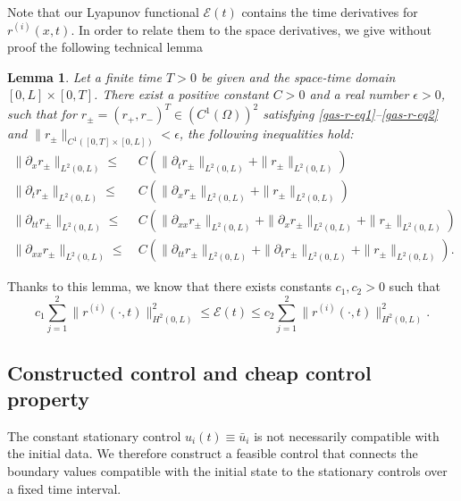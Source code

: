 \documentclass[12pt]{article}
\newtheorem{lemma}[theorem]{Lemma}
\numberwithin{equation}{section}
\begin{document}
Note that our Lyapunov functional $\mathcal{E}(t)$ contains the time derivatives for $r^{(i)}(x,t)$.
In order to relate them to the space
derivatives, we give without proof the following technical lemma \cite{MR3049647}
\begin{lemma}
Let a finite time $T > 0$ be given and the space-time domain $[0, L]\times [0, T ]$.
There exist a positive constant $C>0$ and a real number $\epsilon > 0$, such that for
$r_{\pm} = (r_+, r_-)^T \in (C^1(\Omega))^2$ satisfying \eqref{gas-r-eq1}--\eqref{gas-r-eq2} and $\|r_\pm\|_{C^1([0,T]\times [0,L])}<\epsilon$, the following inequalities hold:
\begin{align*}
\|\partial_xr_\pm\|_{L^2(0,L)}\leq &~C(\|\partial_tr_\pm\|_{L^2(0,L)}+\|r_\pm\|_{L^2(0,L)})\\[2mm]
\|\partial_tr_\pm\|_{L^2(0,L)}\leq &~C(\|\partial_xr_\pm\|_{L^2(0,L)}+\|r_\pm\|_{L^2(0,L)})\\[2mm]
\|\partial_{tt}r_\pm\|_{L^2(0,L)}\leq &~C(\|\partial_{xx}r_\pm\|_{L^2(0,L)}+\|\partial_{x}r_\pm\|_{L^2(0,L)}+\|r_\pm\|_{L^2(0,L)})\\[2mm]
\|\partial_{xx}r_\pm\|_{L^2(0,L)}\leq &~C(\|\partial_{tt}r_\pm\|_{L^2(0,L)}+\|\partial_{t}r_\pm\|_{L^2(0,L)}+\|r_\pm\|_{L^2(0,L)}).
\end{align*}
\end{lemma}
Thanks to this lemma, we know that there exists constants $c_1,c_2>0$ such that 
\begin{equation}\label{eq-equiv}
c_1 \sum_{j=1}^2\|r^{(i)}(\cdot,t)\|^2_{H^2(0,L)} \leq \mathcal{E}(t) \leq c_2 \sum_{j=1}^2\|r^{(i)}(\cdot,t)\|^2_{H^2(0,L)}.
\end{equation}

\subsection{Constructed  control and cheap control property} 
\label{subsec:connecting-control}

The constant stationary control $u_i(t)\equiv\bar u_i$ is not
necessarily compatible with the initial data. We therefore construct
a feasible control that connects the boundary values
compatible with the initial state to the stationary controls over a
fixed time interval.
\end{document}
